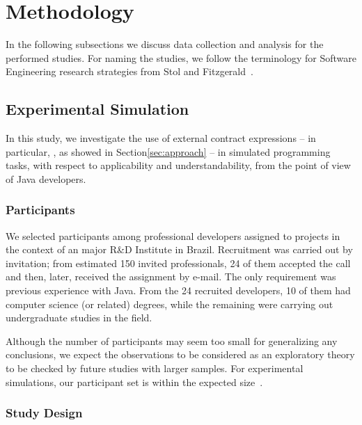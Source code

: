 \section{Methodology}
\label{sec:researchDesign}

In the following subsections we discuss data collection and analysis for the performed studies. For naming the studies, we follow the terminology for Software Engineering research strategies from Stol and Fitzgerald~\cite{Stol2015}.





\subsection{Experimental Simulation}
\label{sec:experiment}

In this study, we investigate the use of
external contract expressions -- in particular, \contrajdoc{}, as showed in Section\ref{sec:approach} -- in simulated programming tasks, with respect to applicability and understandability, from the point of view of Java developers. 

\subsubsection{Participants}
\label{sec:expPart}

We selected participants among professional developers assigned to projects in the context of an major R\&D Institute in Brazil. Recruitment was carried out by invitation; from estimated 150 invited professionals, 24 of them accepted the call and then, later, received the assignment by e-mail. The only requirement was previous experience with Java. From the 24 recruited developers, 10 of them had computer science (or related) degrees, while the remaining were carrying out undergraduate studies in the field. 

Although the number of participants may seem too small for generalizing any conclusions, we expect the observations to be considered as an exploratory theory to be checked by future studies with larger samples.
For experimental simulations, our participant set is within the expected size~\cite{}.


\subsubsection{Study Design}
\label{sec:studyDesign}

